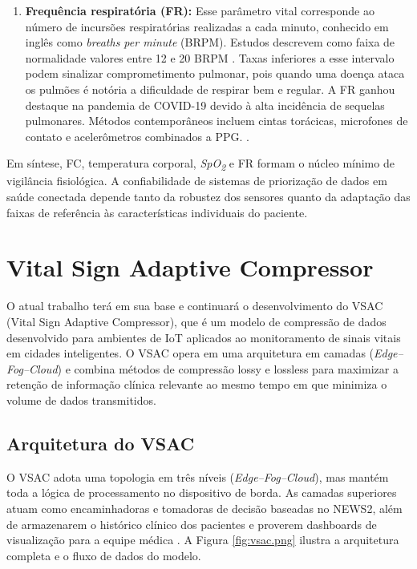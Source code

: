 \documentclass[twoside,english,brazilian]{UNISINOSmonografia}
\begin{document}
\begin{enumerate}
  \item \textbf{Frequência respiratória (FR):} Esse parâmetro vital corresponde ao número de incursões respiratórias realizadas a cada minuto, conhecido em inglês como \textit{breaths per minute} (BRPM). Estudos descrevem como faixa de normalidade valores entre 12 e 20 BRPM \cite{Touw2017}. Taxas inferiores a esse intervalo podem sinalizar comprometimento pulmonar, pois quando uma doença ataca os pulmões é notória a dificuldade de respirar bem e regular. A FR ganhou destaque na pandemia de COVID-19 devido à alta incidência de sequelas pulmonares. Métodos contemporâneos incluem cintas torácicas, microfones de contato e acelerômetros combinados a PPG. \cite{Vitazkova2024}.
\end{enumerate}

Em síntese, FC, temperatura corporal, \textit{SpO\textsubscript{2}} e FR formam o núcleo mínimo de vigilância fisiológica. A confiabilidade de sistemas de priorização de dados em saúde conectada depende tanto da robustez dos sensores quanto da adaptação das faixas de referência às características individuais do paciente.

\section{Vital Sign Adaptive Compressor}
\label{sec:vsac}

O atual trabalho terá em sua base e continuará o desenvolvimento do VSAC (Vital Sign Adaptive Compressor), que é um modelo de compressão de dados desenvolvido para ambientes de IoT aplicados ao monitoramento de sinais vitais em cidades inteligentes. O VSAC opera em uma arquitetura em camadas (\textit{Edge–Fog–Cloud}) e combina métodos de compressão lossy e lossless para maximizar a retenção de informação clínica relevante ao mesmo tempo em que minimiza o volume de dados transmitidos.

\subsection{Arquitetura do VSAC}

O VSAC adota uma topologia em três níveis (\textit{Edge–Fog–Cloud}), mas mantém toda a lógica de processamento no dispositivo de borda. As camadas superiores atuam como encaminhadoras e tomadoras de decisão baseadas no NEWS2, além de armazenarem o histórico clínico dos pacientes e proverem dashboards de visualização para a equipe médica \cite{Andrade2025}. A Figura \ref{fig:vsac.png} ilustra a arquitetura completa e o fluxo de dados do modelo.
\end{document}
